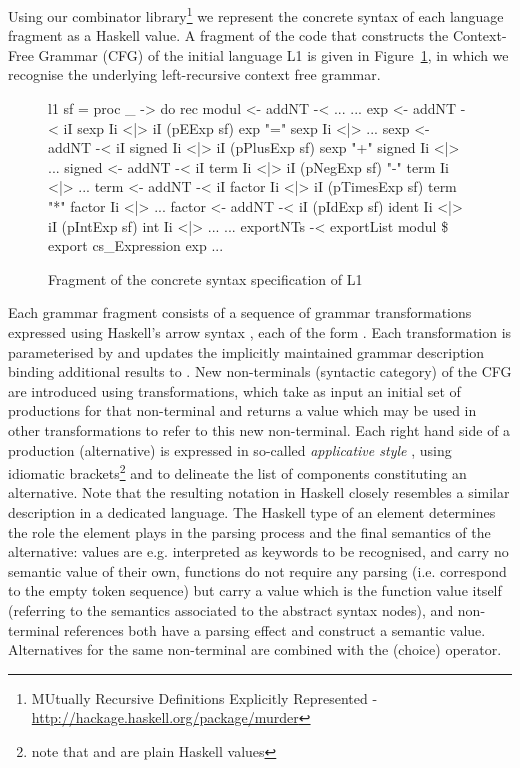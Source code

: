 Using our combinator library\footnote{MUtually Recursive Definitions Explicitly Represented - \url{http://hackage.haskell.org/package/murder}} \cite{VSD12} we represent  the concrete syntax of each language fragment as a Haskell value.
A fragment of the code that constructs the Context-Free Grammar (CFG) of the initial language L1 is given in Figure~\ref{fig:gram}, in which we recognise the underlying left-recursive context free grammar.
\begin{figure}[th]
\begin{center}
\begin{haskell}
l1 sf = proc _ -> do
   rec modul  <- addNT -< ...
       ...
       exp    <- addNT -< iI sexp   Ii <|> 
                          iI (pEExp     sf) exp  "=" sexp   Ii <|> ...
       sexp   <- addNT -< iI signed Ii <|> 
                          iI (pPlusExp  sf) sexp "+" signed Ii <|> ...
       signed <- addNT -< iI term   Ii <|> 
                          iI (pNegExp   sf) "-" term Ii <|> ... 
       term   <- addNT -< iI factor Ii <|> 
                          iI (pTimesExp sf) term "*" factor Ii <|> ...
       factor <- addNT -< iI (pIdExp    sf) ident Ii <|>  
                          iI (pIntExp   sf) int   Ii <|> ...
       ...
   exportNTs -< exportList modul \$ export cs_Expression exp ...
\end{haskell}
\vspace{-15pt}
\caption{Fragment of the concrete syntax specification of L1}
\label{fig:gram}
\end{center}
\end{figure}
Each grammar fragment consists of a sequence of grammar transformations expressed using Haskell's arrow syntax \cite{507664}, each of the form . Each transformation is parameterised by  and updates the implicitly maintained grammar description binding additional results to .
New non-terminals (syntactic category) of the CFG are introduced using   transformations, which take as input an initial set of productions for that non-terminal and returns a value which may be used in other transformations to refer to this new non-terminal.  Each right hand side of a production (alternative) is expressed in so-called \emph{applicative style} \cite{McB07},
using idiomatic brackets\footnote{note that  and  are plain Haskell values}   and  to delineate the list of components constituting an alternative. Note that the resulting  notation in Haskell closely resembles a similar description in a dedicated language.  The Haskell type of an element determines the role the element plays in the parsing process and the final semantics of the alternative:  values are e.g. interpreted as keywords to be recognised, and carry no semantic value of their own, functions do not require any parsing (i.e. correspond to the empty token sequence) but carry a value which is the function value itself (referring to the semantics associated to the abstract syntax nodes), 
and non-terminal references both have a parsing effect  and construct a semantic value.
Alternatives for the same non-terminal are combined with the \texthaskell{<|>} (choice) operator.

